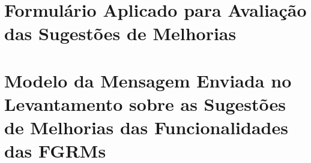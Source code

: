\begin{appendices}
\chapter{Formulário Aplicado para Avaliação das Sugestões de Melhorias}\label{ch:app-form-sug-melhorias}


\chapter{Modelo da Mensagem Enviada no Levantamento sobre as Sugestões de
    Melhorias das Funcionalidades das
    FGRMs}\label{ch:app-template-msg-avaliacao-sug-melhorias}


\end{appendices}